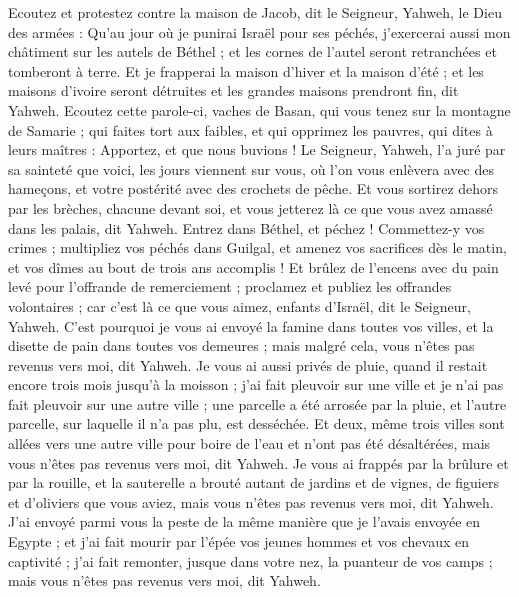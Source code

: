 \begin{multicols}{2}
Ecoutez et protestez contre la maison de Jacob, dit le Seigneur, Yahweh, le Dieu des armées :
Qu'au jour où je punirai Israël pour ses péchés, j'exercerai aussi mon châtiment sur les autels de Béthel ; et les cornes de l'autel seront retranchées et tomberont à terre.
Et je frapperai la maison d'hiver et la maison d'été ; et les maisons d'ivoire seront détruites et les grandes maisons prendront fin, dit Yahweh.
\VerseOne{}Ecoutez cette parole-ci, vaches de Basan, qui vous tenez sur la montagne de Samarie ; qui faites tort aux faibles, et qui opprimez les pauvres, qui dites à leurs maîtres : Apportez, et que nous buvions !
Le Seigneur, Yahweh, l'a juré par sa sainteté que voici, les jours viennent sur vous, où l'on vous enlèvera avec des hameçons, et votre postérité avec des crochets de pêche.
Et vous sortirez dehors par les brèches, chacune devant soi, et vous jetterez là ce que vous avez amassé dans les palais, dit Yahweh.
Entrez dans Béthel, et péchez ! Commettez-y vos crimes ; multipliez vos péchés dans Guilgal, et amenez vos sacrifices dès le matin, et vos dîmes au bout de trois ans accomplis !
Et brûlez de l'encens avec du pain levé pour l'offrande de remerciement ; proclamez et publiez les offrandes volontaires ; car c'est là ce que vous aimez, enfants d'Israël, dit le Seigneur, Yahweh.
C'est pourquoi je vous ai envoyé la famine dans toutes vos villes, et la disette de pain dans toutes vos demeures ; mais malgré cela, vous n'êtes pas revenus vers moi, dit Yahweh.
Je vous ai aussi privés de pluie, quand il restait encore trois mois jusqu'à la moisson ; j'ai fait pleuvoir sur une ville et je n'ai pas fait pleuvoir sur une autre ville ; une parcelle a été arrosée par la pluie, et l'autre parcelle, sur laquelle il n'a pas plu, est desséchée.
Et deux, même trois villes sont allées vers une autre ville pour boire de l'eau et n'ont pas été désaltérées, mais vous n'êtes pas revenus vers moi, dit Yahweh.
Je vous ai frappés par la brûlure et par la rouille, et la sauterelle a brouté autant de jardins et de vignes, de figuiers et d'oliviers que vous aviez, mais vous n'êtes pas revenus vers moi, dit Yahweh.
J'ai envoyé parmi vous la peste de la même manière que je l'avais envoyée en Egypte ; et j'ai fait mourir par l'épée vos jeunes hommes et vos chevaux en captivité ; j'ai fait remonter, jusque dans votre nez, la puanteur de vos camps ; mais vous n'êtes pas revenus vers moi, dit Yahweh.

\end{multicols}

